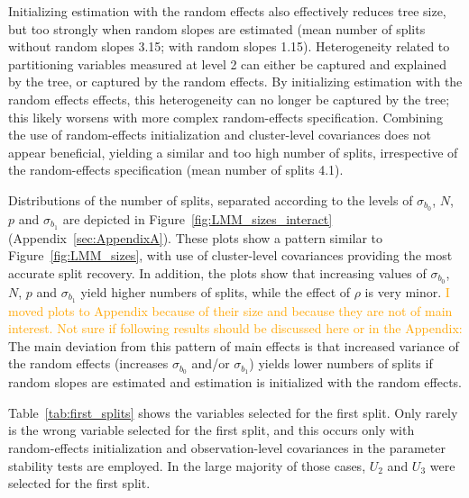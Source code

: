 \documentclass[doc,floatsintext,natbib]{apa7}
\begin{document}
Initializing estimation with the random effects also effectively reduces tree size, but too strongly when random slopes are estimated (mean number of splits without random slopes 3.15; with random slopes 1.15). Heterogeneity related to partitioning variables measured at level 2 can either be captured and explained by the tree, or captured by the random effects. By initializing estimation with the random effects effects, this heterogeneity can no longer be captured by the tree; this likely worsens with more complex random-effects specification. Combining the use of random-effects initialization and cluster-level covariances does not appear beneficial, yielding a similar and too high number of splits, irrespective of the random-effects specification (mean number of splits 4.1).

Distributions of the number of splits, separated according to the levels of $\sigma_{b_0}$, $N$, $p$ and $\sigma_{b_1}$ are depicted in Figure~\ref{fig:LMM_sizes_interact} (Appendix~\ref{sec:AppendixA}). These plots show a pattern similar to Figure~\ref{fig:LMM_sizes}, with use of cluster-level covariances providing the most accurate split recovery. In addition, the plots show that increasing values of $\sigma_{b_0}$, $N$, $p$ and $\sigma_{b_1}$ yield higher numbers of splits, while the effect of $\rho$ is very minor. \textcolor{orange}{I moved plots to Appendix because of their size and because they are not of main interest. Not sure if following results should be discussed here or in the Appendix:} The main deviation from this pattern of main effects is that increased variance of the random effects (increases $\sigma_{b_0}$ and/or $\sigma_{b_1}$) yields lower numbers of splits if random slopes are estimated and estimation is initialized with the random effects.

Table~\ref{tab:first_splits} shows the variables selected for the first split. Only rarely is the wrong variable selected for the first split, and this occurs only with random-effects initialization and observation-level covariances in the parameter stability tests are employed. In the large majority of those cases, $U_2$ and $U_3$ were selected for the first split. 
\end{document}
